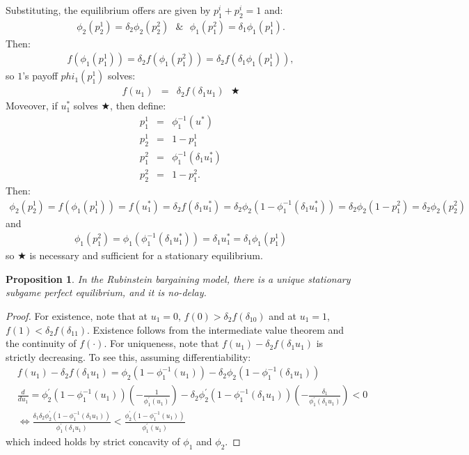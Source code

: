 \documentclass[12pt]{article}
\newtheorem{propo}{Proposition}[section]
\newcommand{\n}{\noindent}
\newcommand{\s}{\vspace{5mm}}
\begin{document}
\s
\n Substituting, the equilibrium offers are given by $p_1^i+p_2^i=1$ and:
\begin{eqnarray*}
\phi_2(p_2^1)=\delta_2\phi_2(p_2^2)\mbox{  }\&\mbox{  }\phi_1(p_1^2)=\delta_1\phi_1(p_1^1).
\end{eqnarray*} Then:
\begin{eqnarray*}
f(\phi_1(p_1^1))=\delta_2f(\phi_1(p_1^2))=\delta_2f(\delta_1\phi_1(p_1^1)),
\end{eqnarray*} so $1$'s payoff $phi_1(p_1^1)$ solves:
\begin{eqnarray*}
f(u_1)&=&\delta_2f(\delta_1u_1)\mbox{           }\bigstar
\end{eqnarray*}  Moveover, if $u_1^*$ solves $\bigstar$, then define:
\begin{eqnarray*}
p_1^1&=&\phi_1^{-1}(u^*)\\
p_2^1&=&1-p_1^1\\
p_1^2&=&\phi_1^{-1}(\delta_1u_1^*)\\
p_2^2&=&1-p_1^2.
\end{eqnarray*}  Then:
\begin{eqnarray*}
\phi_2(p_2^1)=f(\phi_1(p_1^1))=f(u_1^*)=\delta_2f(\delta_1u_1^*)=\delta_2\phi_2(1-\phi_1^{-1}(\delta_1u_1^*))=\delta_2\phi_2(1-p_1^2)=\delta_2\phi_2(p_2^2)
\end{eqnarray*} and
\begin{eqnarray*}
\phi_1(p_1^2)=\phi_1(\phi_1^{-1}(\delta_1u_1^*))=\delta_1u_1^*=\delta_1\phi_1(p_1^1)
\end{eqnarray*} so $\bigstar$ is necessary and sufficient  for a stationary equilibrium.  

\s
\n\begin{propo}  In the Rubinstein bargaining model, there is a unique stationary subgame perfect equilibrium, and it is no-delay.
\end{propo}
\begin{proof}  For existence, note that at $u_1=0$,  $f(0)>\delta_2f(\delta_10)$ and at $u_1=1$, $f(1)<\delta_2f(\delta_11)$.  Existence follows from the intermediate value theorem and the continuity of $f(\cdot)$.  For uniqueness, note that $f(u_1)-\delta_2f(\delta_1u_1)$ is strictly decreasing.  To see this, assuming differentiability: 
\begin{align*}
&f(u_1)-\delta_2f(\delta_1u_1)=\phi_2(1-\phi_1^{-1}(u_1))-\delta_2\phi_2(1-\phi_1^{-1}(\delta_1u_1))\\
&\frac{d}{du_1}=\phi_2^{\prime}(1-\phi_1^{-1}(u_1))\left(-\frac{1}{\phi_1^{\prime}(u_1)}\right)-\delta_2\phi_2^{\prime}(1-\phi_1^{-1}(\delta_1u_1))\left(-\frac{\delta_1}{\phi_1^{\prime}(\delta_1u_1)}\right)<0\\
&\Longleftrightarrow \frac{\delta_1\delta_2\phi_2^{\prime}(1-\phi_1^{-1}(\delta_1u_1))}{\phi_1^{\prime}(\delta_1u_1)}<\frac{\phi_2^{\prime}(1-\phi_1^{-1}(u_1))}{\phi_1^{\prime}(u_1)}
\end{align*} which indeed holds by strict concavity of $\phi_1$ and $\phi_2$.
\end{proof}
\end{document}
